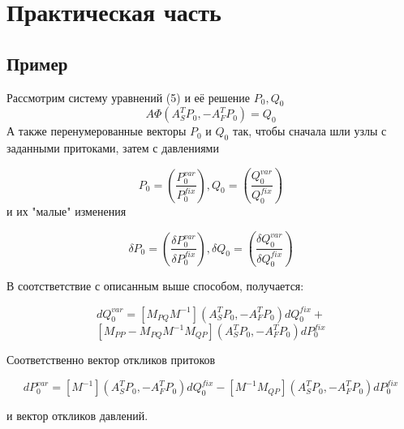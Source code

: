 \chapter{Практическая часть}
\section{Пример}
Рассмотрим систему уравнений (5) и её решение $ P_0, Q_0 $
$$ A \Phi(A_S^T P_0, -A_F^T P_0) = Q_0 $$
А также перенумерованные векторы $ P_0 $ и $ Q_0 $ так, чтобы сначала шли узлы с заданными притоками, затем с давлениями

$$ P_0 = \left(\frac{P_0^{var}}{P_0^{fix}}\right), Q_0 = \left(\frac{Q_0^{var}}{Q_0^{fix}}\right) $$
и их "малые" изменения

$$ \delta P_0 = \left(\frac{ \delta P_0^{var}}{ \delta P_0^{fix}}\right), \delta Q_0 = \left(\frac{ \delta Q_0^{var}}{ \delta  Q_0^{fix}}\right) $$

В соотстветствие с описанным выше способом, получается:

$$ dQ_0^{var} = [ M_{PQ} M^{-1} ] ( A_S^T P_0, -A_F^T P_0  ) dQ_0^{fix} + $$ $$ [ M_{PP} - M_{PQ} M^{-1} M_{QP} ] ( A_S^T P_0, -A_F^T P_0 ) dP_0^{fix} $$

Соответственно вектор откликов притоков

$$ dP_0^{var} = [M^{-1}](A_S^T P_0, -A_F^T P_0) dQ_0^{fix} - [M^{-1} M_{QP}](A_S^T P_0, -A_F^T P_0) dP_0^{fix} $$

и вектор откликов давлений.